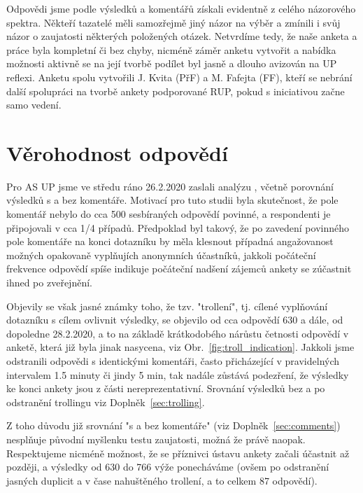 \documentclass[a4paper,twoside]{article}
\begin{document}
Odpovědi jsme podle výsledků a komentářů získali evidentně z celého názorového spektra. Někteří tazatelé měli samozřejmě jiný názor na výběr a zmínili i svůj názor o zaujatosti některých položených otázek. Netvrdíme tedy, že naše anketa a práce byla kompletní či bez chyby, nicméně záměr anketu vytvořit a nabídka možnosti aktivně se na její tvorbě podílet byl jasně a dlouho avizován na UP reflexi. Anketu spolu vytvořili J. Kvita (PřF) a M. Fafejta (FF), kteří se nebrání další spolupráci na tvorbě ankety podporované RUP, pokud s iniciativou začne samo vedení.


\section{Věrohodnost odpovědí}
\label{sec:Sel}
Pro AS UP jsme ve středu ráno 26.2.2020 zaslali analýzu , včetně porovnání výsledků s a bez komentáře.
Motivací pro tuto studii byla skutečnost, že pole komentář nebylo do cca 500 sesbíraných odpovědí povinné, a respondenti je připojovali v cca 1/4 případů. Předpoklad byl takový, že po zavedení povinného pole komentáře na konci dotazníku by měla klesnout případná angažovanost možných opakovaně vyplňujích anonymních účastníků, jakkoli počáteční frekvence odpovědí spíše indikuje počáteční nadšení zájemců ankety se zúčastnit ihned po zveřejnění. 

Objevily se však jasné známky toho, že tzv. "trollení", tj. cílené vyplňování dotazníku s cílem ovlivnit výsledky, se objevilo od cca odpovědí 630 a dále, od dopoledne 28.2.2020, a to na základě krátkodobého nárůstu četnosti odpovědí v anketě, která již byla jinak nasycena, viz Obr.~\ref{fig:troll_indication}. Jakkoli jsme odstranili odpovědi s identickými komentáři, často přicházející v pravidelných intervalem 1.5 minuty či jindy 5 min, tak nadále zůstává podezření, že výsledky ke konci ankety jsou z části nereprezentativní. Srovnání výsledků bez a po odstranění trollingu viz Doplněk~\ref{sec:trolling}.

Z toho důvodu již srovnání "s a bez komentáře" (viz Doplněk~\ref{sec:comments}) nesplňuje původní myšlenku testu zaujatosti, možná že právě naopak. Respektujeme nicméně možnost, že se příznivci ústavu ankety začali účastnit až později, a výsledky od 630 do 766 výže ponecháváme (ovšem po odstranění jasných duplicit a v čase nahuštěného trollení, a to celkem 87 odpovědí). 
\end{document}
